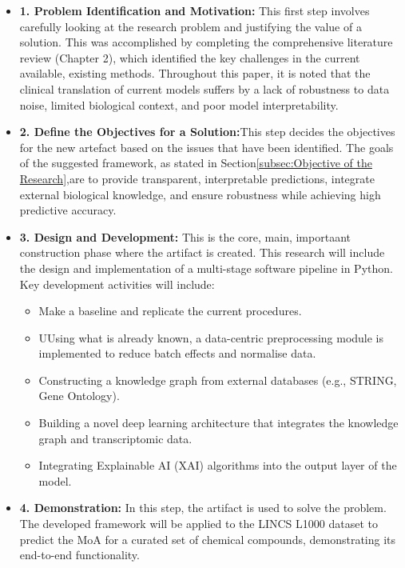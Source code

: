 \documentclass[12pt,a4paper]{article}
\begin{document}
\begin{itemize}
    \item \textbf{1. Problem Identification and Motivation:} This first step involves carefully looking at the research problem and justifying the value of a solution. This was accomplished by completing the comprehensive literature review (Chapter 2), which identified the key challenges in the current available, existing methods. Throughout this paper, it is noted that the clinical translation of current models suffers by a lack of robustness to data noise, limited biological context, and poor model interpretability.

    \item \textbf{2. Define the Objectives for a Solution:}This step decides the objectives for the new artefact based on the issues that have been identified. The goals of the suggested framework, as stated in Section\ref{subsec:Objective of the Research},are to provide transparent, interpretable predictions, integrate external biological knowledge, and ensure robustness while achieving high predictive accuracy.

    \item \textbf{3. Design and Development:} This is the core, main, importaant construction phase where the artifact is created. This research will include the design and implementation of a multi-stage software pipeline in Python. Key development activities will include:
        \begin{itemize}
            \item Make a baseline and replicate the current procedures. 
            \item UUsing what is already known, a data-centric preprocessing module is implemented to reduce batch effects and normalise data.
            \item Constructing a knowledge graph from external databases (e.g., STRING, Gene Ontology).
            \item Building a novel deep learning architecture that integrates the knowledge graph and transcriptomic data.
            \item Integrating Explainable AI (XAI) algorithms into the output layer of the model.
        \end{itemize}

    \item \textbf{4. Demonstration:} In this step, the artifact is used to solve the problem. The developed framework will be applied to the LINCS L1000 dataset to predict the MoA for a curated set of chemical compounds, demonstrating its end-to-end functionality.


\end{itemize}
\end{document}
